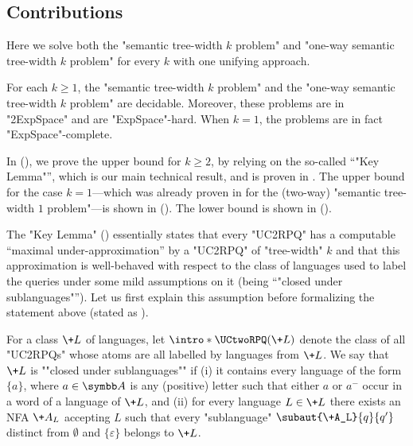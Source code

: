 \subsection{\AP{}Contributions}
Here we solve both the "semantic tree-width $k$ problem" and "one-way semantic tree-width $k$ problem" for every $k$ with one unifying approach.
\begin{theorem}
    \AP\label{thm:decidability-semtw}
    For each $k \geq 1$, the "semantic tree-width $k$ problem" and the "one-way semantic tree-width $k$ problem" are decidable. Moreover, these problems are in "2ExpSpace" and are "ExpSpace"-hard.
	When $k=1$, the problems are in fact "ExpSpace"-complete.
\end{theorem}
In  (),
we prove the upper bound for $k\geq 2$, by relying on the so-called ``"Key Lemma"'', which is our main technical result, and is proven in .
The upper bound for the case $k=1$---which was already proven in \cite{BarceloRomeroVardi2016SemanticAcyclicity} for the (two-way) "semantic tree-width $1$ problem"---is shown in  (). The lower bound is shown in  ().

The "Key Lemma" () essentially states that
every "UC2RPQ" has a computable ``maximal under-approximation'' by a "UC2RPQ" of "tree-width" $k$ and that this approximation is well-behaved with respect to the class of languages used to label the queries under some mild assumptions on it (being ``"closed under sublanguages"''). Let us first
explain this assumption before formalizing the statement above (stated as ).

For a class $\+L$ of languages, let $\intro*\UCtwoRPQ(\+L)$ denote the class of all "UC2RPQs" whose atoms are all labelled by languages from $\+L$.
\AP We say that $\+L$ is ""closed under sublanguages"" if
(i) it contains every language of the form $\{a\}$,
where $a \in \A$ is any (positive) letter such that either $a$ or $a^-$ occur in a word of a
language of $\+L$, and (ii) for every language $L \in \+L$ there exists an NFA $\+A_L$ accepting $L$ such that every "sublanguage" $\subaut{\+A_L}{q}{q'}$ distinct from $\emptyset$ and
$\{\varepsilon\}$ belongs to $\+L$.

